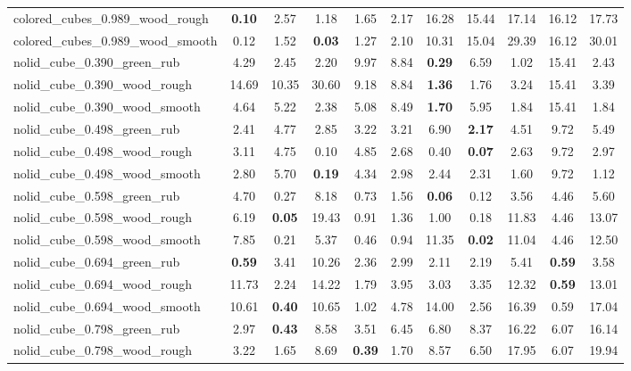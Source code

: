 \begin{table}[H]
{\begin{tabular}{l cccccccccc}
        colored\_cubes\_0.989\_wood\_rough & \textbf{0.10} & 2.57 & 1.18 & 1.65 & 2.17 & 16.28 & 15.44 & 17.14 & 16.12 & 17.73 \\
        colored\_cubes\_0.989\_wood\_smooth & 0.12 & 1.52 & \textbf{0.03} & 1.27 & 2.10 & 10.31 & 15.04 & 29.39 & 16.12 & 30.01 \\
        nolid\_cube\_0.390\_green\_rub & 4.29 & 2.45 & 2.20 & 9.97 & 8.84 & \textbf{0.29} & 6.59 & 1.02 & 15.41 & 2.43 \\
        nolid\_cube\_0.390\_wood\_rough & 14.69 & 10.35 & 30.60 & 9.18 & 8.84 & \textbf{1.36} & 1.76 & 3.24 & 15.41 & 3.39 \\
        nolid\_cube\_0.390\_wood\_smooth & 4.64 & 5.22 & 2.38 & 5.08 & 8.49 & \textbf{1.70} & 5.95 & 1.84 & 15.41 & 1.84 \\
        nolid\_cube\_0.498\_green\_rub & 2.41 & 4.77 & 2.85 & 3.22 & 3.21 & 6.90 & \textbf{2.17} & 4.51 & 9.72 & 5.49 \\
        nolid\_cube\_0.498\_wood\_rough & 3.11 & 4.75 & 0.10 & 4.85 & 2.68 & 0.40 & \textbf{0.07} & 2.63 & 9.72 & 2.97 \\
        nolid\_cube\_0.498\_wood\_smooth & 2.80 & 5.70 & \textbf{0.19} & 4.34 & 2.98 & 2.44 & 2.31 & 1.60 & 9.72 & 1.12 \\
        nolid\_cube\_0.598\_green\_rub & 4.70 & 0.27 & 8.18 & 0.73 & 1.56 & \textbf{0.06} & 0.12 & 3.56 & 4.46 & 5.60 \\
        nolid\_cube\_0.598\_wood\_rough & 6.19 & \textbf{0.05} & 19.43 & 0.91 & 1.36 & 1.00 & 0.18 & 11.83 & 4.46 & 13.07 \\
        nolid\_cube\_0.598\_wood\_smooth & 7.85 & 0.21 & 5.37 & 0.46 & 0.94 & 11.35 & \textbf{0.02} & 11.04 & 4.46 & 12.50 \\
        nolid\_cube\_0.694\_green\_rub & \textbf{0.59} & 3.41 & 10.26 & 2.36 & 2.99 & 2.11 & 2.19 & 5.41 & \textbf{0.59} & 3.58 \\
        nolid\_cube\_0.694\_wood\_rough & 11.73 & 2.24 & 14.22 & 1.79 & 3.95 & 3.03 & 3.35 & 12.32 & \textbf{0.59} & 13.01 \\
        nolid\_cube\_0.694\_wood\_smooth & 10.61 & \textbf{0.40} & 10.65 & 1.02 & 4.78 & 14.00 & 2.56 & 16.39 & 0.59 & 17.04 \\
        nolid\_cube\_0.798\_green\_rub & 2.97 & \textbf{0.43} & 8.58 & 3.51 & 6.45 & 6.80 & 8.37 & 16.22 & 6.07 & 16.14 \\
        nolid\_cube\_0.798\_wood\_rough & 3.22 & 1.65 & 8.69 & \textbf{0.39} & 1.70 & 8.57 & 6.50 & 17.95 & 6.07 & 19.94 \\

\end{tabular}}
\end{table}
